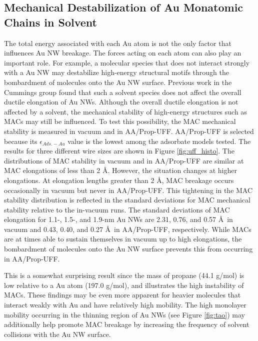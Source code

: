 \documentclass[10pt]{report}  %
\newcommand\findent{\hspace*{\parindent}}
\begin{document}
\subsection{Mechanical Destabilization of Au Monatomic Chains in Solvent}

\findent The total energy associated with each Au atom is not the only factor that influences Au NW breakage.  The forces acting on each atom can also play an important role.  For example, a molecular species that does not interact strongly with a Au NW may destabilize high-energy structural motifs through the bombardment of molecules onto the Au NW surface.  Previous work \cite{Pu:2007} in the Cummings group found that such a solvent species does not affect the overall ductile elongation of Au NWs.  Although the overall ductile elongation is not affected by a solvent, the mechanical stability of high-energy structures such as MACs may still be influenced.  To test this possibility, the MAC mechanical stability is measured in vacuum and in AA/Prop-UFF.  AA/Prop-UFF is selected because its $\epsilon_{Ads.-Au}$ value is the lowest among the adsorbate models tested. The results for three different wire sizes are shown in Figure \ref{fig:uff_histo}.  The distributions of MAC stability in vacuum and in AA/Prop-UFF are similar at MAC elongations of less than 2 \AA.  However, the situation changes at higher elongations.  At elongation lengths greater than 2 \AA, MAC breakage occurs occasionally in vacuum but never in AA/Prop-UFF.  This tightening in the MAC stability distribution is reflected in the standard deviations for MAC mechanical stability relative to the in-vacuum runs.  The standard deviations of MAC elongation for 1.1-, 1.5-, and 1.9-nm Au NWs are 2.31, 0.76, and 0.57 \AA\ in vacuum and 0.43, 0.40, and 0.27 \AA\ in AA/Prop-UFF, respectively.  While MACs are at times able to sustain themselves in vacuum up to high elongations, the bombardment of molecules onto the Au NW surface prevents this from occurring in AA/Prop-UFF.  

This is a somewhat surprising result since the mass of propane (44.1 g/mol) is low relative to a Au atom (197.0 g/mol), and illustrates the high instability of MACs.  These findings may be even more apparent for heavier molecules that interact weakly with Au and have relatively high mobility.  The high monolayer mobility occurring in the thinning region of Au NWs (see Figure \ref{fig:tao}) may additionally help promote MAC breakage by increasing the frequency of solvent collisions with the Au NW surface.
\end{document}
